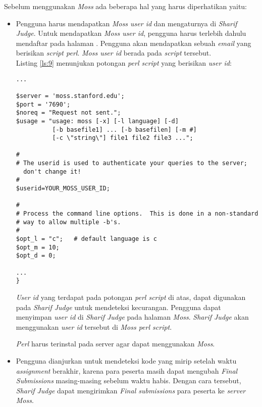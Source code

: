 Sebelum menggunakan \textit{Moss} ada beberapa hal yang harus diperhatikan yaitu:
\begin{itemize}
	\item Pengguna harus mendapatkan \textit{Moss user id} dan mengaturnya di \textit{Sharif Judge}. Untuk mendapatkan \textit{Moss user id}, pengguna harus terlebih dahulu mendaftar pada halaman . Pengguna akan mendapatkan sebuah \textit{email} yang berisikan \textit{script perl}. \textit{Moss user id} berada pada \textit{script} tersebut. \\
	Listing \ref{ls:9} menunjukan potongan \textit{perl script} yang berisikan \textit{user id}:

\begin{lstlisting}[basicstyle=\ttfamily, caption=Potongan \textit{perl script}, label=ls:9, frame=single,
columns=fullflexible, keepspaces=true, breaklines=true]
...

$server = 'moss.stanford.edu';
$port = '7690';
$noreq = "Request not sent.";
$usage = "usage: moss [-x] [-l language] [-d] 
		  [-b basefile1] ... [-b basefilen] [-m #] 
		  [-c \"string\"] file1 file2 file3 ...";

#
# The userid is used to authenticate your queries to the server; 
  don't change it!
#
$userid=YOUR_MOSS_USER_ID;

#
# Process the command line options.  This is done in a non-standard
# way to allow multiple -b's.
#
$opt_l = "c";   # default language is c
$opt_m = 10;
$opt_d = 0;

...
}

\end{lstlisting}

 \textit{User id} yang terdapat pada potongan \textit{perl script} di atas, dapat digunakan pada \textit{Sharif Judge} untuk mendeteksi kecurangan. Pengguna dapat menyimpan \textit{user id} di \textit{Sharif Judge} pada halaman \textit{Moss}. \textit{Sharif Judge} akan menggunakan \textit{user id} tersebut di \textit{Moss perl script}.

 \textit{Perl} harus terinstal pada server agar dapat menggunakan \textit{Moss}.

\item Pengguna dianjurkan untuk mendeteksi kode yang mirip setelah waktu \textit{assignment} berakhir, karena para peserta masih dapat mengubah \textit{Final Submissions} masing-masing sebelum waktu habis. Dengan cara tersebut, \textit{Sharif Judge} dapat mengirimkan \textit{Final submissions} para peserta ke \textit{server Moss}.
\end{itemize}

